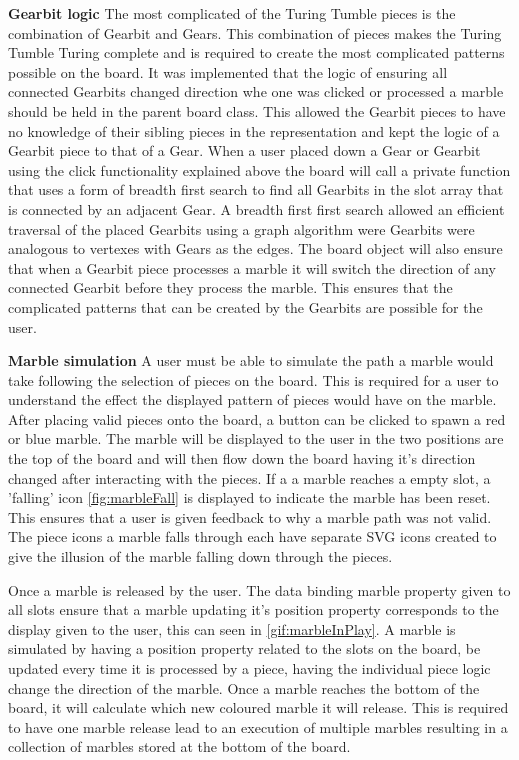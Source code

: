 \documentclass{l4proj}
\begin{document}
\textbf{Gearbit logic} 
The most complicated of the Turing Tumble pieces is the combination of Gearbit and Gears. This combination of pieces makes the Turing Tumble Turing complete and is required to create the most complicated patterns possible on the board. It was implemented that the logic of ensuring all connected Gearbits changed direction whe one was clicked or processed a marble should be held in the parent board class. This allowed the Gearbit pieces to have no knowledge of their sibling pieces in the representation and kept the logic of a Gearbit piece to that of a Gear. When a user placed down a Gear or Gearbit using the click functionality explained above the board will call a private function that uses a form of breadth first search to find all Gearbits in the slot array that is connected by an adjacent Gear. A breadth first first search allowed an efficient traversal of the placed Gearbits using a graph algorithm were Gearbits were analogous to vertexes with Gears as the edges. The board object will also ensure that when a Gearbit piece processes a marble it will switch the direction of any connected Gearbit before they process the marble. This ensures that the complicated patterns that can be created by the Gearbits are possible for the user.

\textbf{Marble simulation}
A user must be able to simulate the path a marble would take following the selection of pieces on the board. This is required for a user to understand the effect the displayed pattern of pieces would have on the marble. After placing valid pieces onto the board, a button can be clicked to spawn a red or blue marble. The marble will be displayed to the user in the two positions are the top of the board and will then flow down the board having it's direction changed after interacting with the pieces. If a a marble reaches a empty slot, a 'falling' icon \ref{fig:marbleFall} is displayed to indicate the marble has been reset. This ensures that a user is given feedback to why a marble path was not valid. The piece icons a marble falls through each have separate SVG icons created to give the illusion of the marble falling down through the pieces.

Once a marble is released by the user. The data binding marble property given to all slots ensure that a marble updating it's position property corresponds to the display given to the user, this can seen in \ref{gif:marbleInPlay}. A marble is simulated by having a position property related to the slots on the board, be updated every time it is processed by a piece, having the individual piece logic change the direction of the marble. Once a marble reaches the bottom of the board, it will calculate which new coloured marble it will release. This is required to have one marble release lead to an execution of multiple marbles resulting in a collection of marbles stored at the bottom of the board. 
\end{document}
